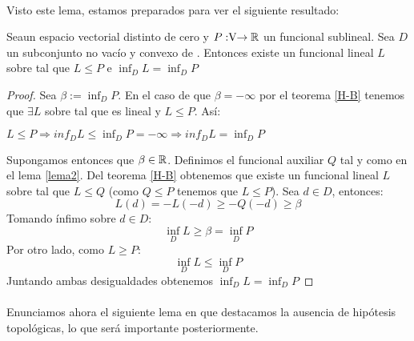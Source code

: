 	\paragraph{}Visto este lema, estamos preparados para ver el siguiente resultado:
	
	\begin{teoremaBox}
		Sea\vecSpace un espacio vectorial distinto de cero y $P:\vecSpace \rightarrow \RR$ un funcional sublineal.  Sea $ D $ un subconjunto no vacío y convexo de \vecSpace. Entonces existe un funcional lineal $ L $ sobre \vecSpace tal que $ L \leq P $ e $ \inf_D L = \inf_D P $
	\end{teoremaBox}
	\begin{proof}
		Sea $ \beta := \inf_D P $. En el caso de que $ \beta = -\infty $ por el teorema \ref{H-B} tenemos que $ \exists L $ sobre \vecSpace tal que es lineal y $ L \leq P$. Así:
		\begin{center}
			$ L \leq P \Longrightarrow inf_D L \leq \inf_D P = -\infty \Longrightarrow inf_D L = \inf_D P$ 
		\end{center}
		
		Supongamos entonces que $ \beta \in \mathbb{R} $. Definimos el funcional auxiliar $ Q $ tal y como en el lema \ref{lema2}. Del teorema \ref{H-B} obtenemos que existe un funcional lineal $ L $ sobre \vecSpace tal que $ L \leq Q$ (como $ Q \leq P $ tenemos que $ L \leq P $). Sea $ d \in D $, entonces:
		\[
		L(d) = -L(-d) \geq -Q(-d) \geq \beta
		\]
		Tomando ínfimo sobre $ d \in D $:
		\[
		\inf_D L \geq \beta = \inf_D P
		\]
		Por otro lado, como $ L \geq P $:
		\[
		\inf_D L \leq\inf_D P
		\]
		Juntando ambas desigualdades obtenemos $ \inf_D L =\inf_D P $
	\end{proof}

	\paragraph{} Enunciamos ahora el siguiente lema en que destacamos la ausencia de hipótesis topológicas, lo que será importante posteriormente.
	
